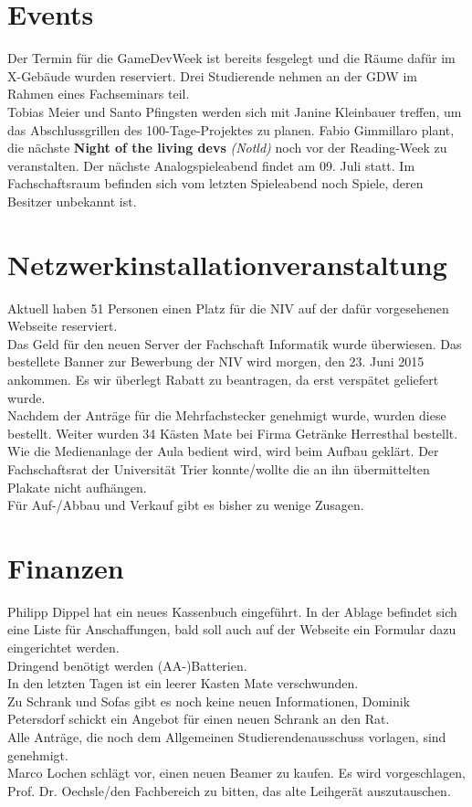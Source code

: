 \documentclass[a4paper, 11pt]{article} %
\begin{document}
\section{Events}
Der Termin für die GameDevWeek ist bereits fesgelegt und die Räume dafür im X-Gebäude wurden reserviert. Drei Studierende nehmen an der GDW im Rahmen eines Fachseminars teil.\\
Tobias Meier und Santo Pfingsten werden sich mit Janine Kleinbauer treffen, um das Abschlussgrillen des 100-Tage-Projektes zu planen.
Fabio Gimmillaro plant, die nächste \textbf{Night of the living devs} \textit{(Notld)} noch vor der Reading-Week zu veranstalten.
Der nächste Analogspieleabend findet am 09. Juli statt. Im Fachschaftsraum befinden sich vom letzten Spieleabend noch Spiele, deren Besitzer unbekannt ist.

\section{Netzwerkinstallationveranstaltung}
Aktuell haben 51 Personen einen Platz für die NIV auf der dafür vorgesehenen Webseite reserviert.\\
Das Geld für den neuen Server der Fachschaft Informatik wurde überwiesen. Das bestellete Banner zur Bewerbung der NIV wird morgen, den 23. Juni 2015 ankommen. Es wir überlegt Rabatt zu beantragen, da erst verspätet geliefert wurde.\\
Nachdem der Anträge für die Mehrfachstecker genehmigt wurde, wurden diese bestellt. Weiter wurden 34 Kästen Mate bei Firma Getränke Herresthal bestellt.\\
Wie die Medienanlage der Aula bedient wird, wird beim Aufbau geklärt.
Der Fachschaftsrat der Universität Trier konnte/wollte die an ihn übermittelten Plakate nicht aufhängen.\\
Für Auf-/Abbau und Verkauf gibt es bisher zu wenige Zusagen.

\section{Finanzen}
Philipp Dippel hat ein neues Kassenbuch eingeführt. In der Ablage befindet sich eine Liste für Anschaffungen, bald soll auch auf der Webseite ein Formular dazu eingerichtet werden.\\
Dringend benötigt werden (AA-)Batterien.\\
In den letzten Tagen ist ein leerer Kasten Mate verschwunden.\\
Zu Schrank und Sofas gibt es noch keine neuen Informationen, Dominik Petersdorf schickt ein Angebot für einen neuen Schrank an den Rat.\\
Alle Anträge, die noch dem Allgemeinen Studierendenausschuss vorlagen, sind genehmigt.\\
Marco Lochen schlägt vor, einen neuen Beamer zu kaufen. Es wird vorgeschlagen, Prof. Dr. Oechsle/den Fachbereich zu bitten, das alte Leihgerät auszutauschen.
\end{document}
